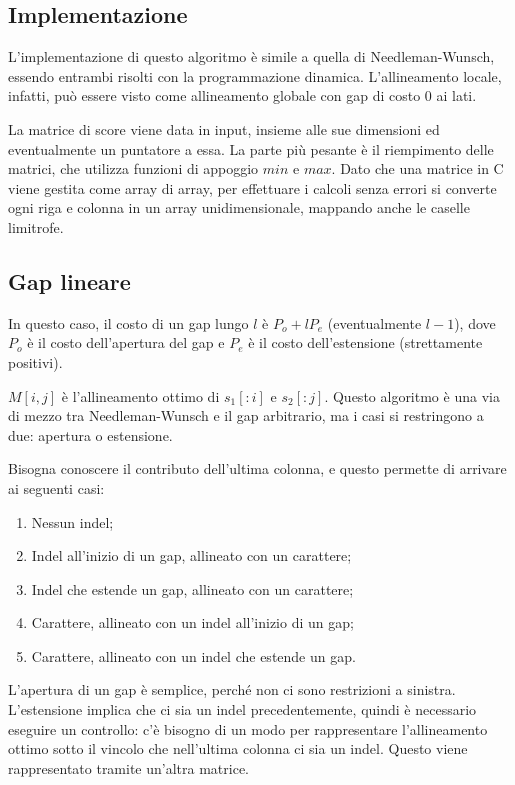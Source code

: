 \subsection{Implementazione}
L'implementazione di questo algoritmo è simile a quella di Needleman-Wunsch, essendo entrambi risolti con la programmazione dinamica. L'allineamento locale, infatti, può essere visto come allineamento globale con gap di costo 0 ai lati. 

La matrice di score viene data in input, insieme alle sue dimensioni ed eventualmente un puntatore a essa. La parte più pesante è il riempimento delle matrici, che utilizza funzioni di appoggio $min$ e $max$. Dato che una matrice in C viene gestita come array di array, per effettuare i calcoli senza errori si converte ogni riga e colonna in un array unidimensionale, mappando anche le caselle limitrofe. 



\subsection{Gap lineare}
In questo caso, il costo di un gap lungo $l$ è $P_o + lP_e$ (eventualmente $l-1$), dove $P_o$ è il costo dell'apertura del gap e $P_e$ è il costo dell'estensione (strettamente positivi).

$M[i, j]$ è l'allineamento ottimo di $s_1[:i]$ e $s_2[:j]$. Questo algoritmo è una via di mezzo tra Needleman-Wunsch e il gap arbitrario, ma i casi si restringono a due: apertura o estensione.

Bisogna conoscere il contributo dell'ultima colonna, e questo permette di arrivare ai seguenti casi:
\begin{enumerate}
	\item Nessun indel;
	\item Indel all'inizio di un gap, allineato con un carattere;
	\item Indel che estende un gap, allineato con un carattere;
	\item Carattere, allineato con un indel all'inizio di un gap;
	\item Carattere, allineato con un indel che estende un gap. 
\end{enumerate}

L'apertura di un gap è semplice, perché non ci sono restrizioni a sinistra. L'estensione implica che ci sia un indel precedentemente, quindi è necessario eseguire un controllo: c'è bisogno di un modo per rappresentare l'allineamento ottimo sotto il vincolo che nell'ultima colonna ci sia un indel. Questo viene rappresentato tramite un'altra matrice.

